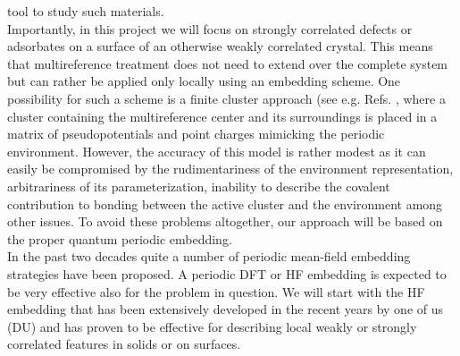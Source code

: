 \documentclass[a4paper,11pt,headings=normal]{scrartcl}
\begin{document}
tool to study such materials. \\
Importantly, in this project we will focus on strongly correlated 
defects or adsorbates on a surface of an otherwise weakly correlated crystal. This 
means that multireference treatment does not need to extend over the complete 
system but can rather be applied only locally using an embedding scheme. 
One possibility for such a scheme is a finite cluster approach (see
e.g. Refs. \cite{Sousa2001,Lepetit2003}, where a cluster containing the
multireference center and its surroundings is placed in a matrix of
pseudopotentials and point charges mimicking the periodic
environment. However, the accuracy of this model is rather modest as it can 
easily be compromised by the rudimentariness of the environment representation, 
arbitrariness of its parameterization, inability to describe the covalent 
contribution to bonding between the active cluster and the environment among 
other issues.\autocite{Lepetit2003} To avoid these problems altogether, our 
approach will be based on the proper quantum periodic embedding.\\
In the past two decades quite a number of periodic mean-field embedding 
strategies have been proposed.\autocite{Jacob08, Manby2012, Libisch2014, 
Goodpaster2014, Jacob2014, Stoyanova2014, masur2016, Libisch2017, usvyat18, 
Chulhai2018, Cui2020, Jones2020, Pham2020, Hegely, WachterLehn2022, schaefer21, 
christlmaier21, Berkelbach21, WachterLehn2022, Lavroff2024}  A periodic DFT or HF 
embedding is expected to be very effective also for the problem in question. We 
will start with the HF embedding that has been extensively developed in the recent 
years by one of us (DU) and has proven to be effective for describing local weakly 
or strongly correlated features in solids or on surfaces.\autocite{masur2016, 
schutz2017, usvyat18, usvyat20, christlmaier21, mullan21, Lavroff2024} 
\end{document}
